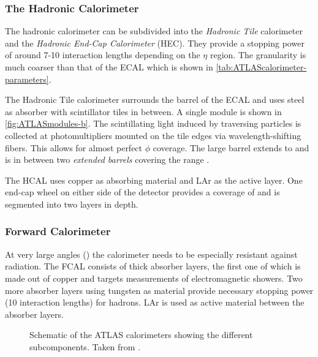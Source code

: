 \subsubsection{The Hadronic Calorimeter}
The hadronic calorimeter can be subdivided into the \emph{Hadronic Tile} calorimeter and the \emph{Hadronic End-Cap Calorimeter} (HEC). They provide a stopping power of around 7-10 interaction lengths depending on the $\eta$ region. The granularity is much coarser than that of the ECAL which is shown in \cref{tab:ATLAScalorimeter-parameters}.

The Hadronic Tile calorimeter surrounds the barrel of the ECAL and uses steel as absorber with scintillator tiles in between. A single module is shown in \cref{fig:ATLASmodules-b}. The scintillating light induced by traversing particles is collected at photomultipliers mounted on the tile edges via wavelength-shifting fibers. This allows for almost perfect $\phi$ coverage. The large barrel extends to  and is in between two \emph{extended barrels} covering the range . 

The HCAL uses copper as absorbing material and LAr as the active layer. One end-cap wheel on either side of the detector provides a coverage of  and is segmented into two layers in depth.

\subsubsection{Forward Calorimeter}
At very large angles () the calorimeter needs to be especially resistant against radiation. The FCAL consists of thick absorber layers, the first one of which is made out of copper and targets measurements of electromagnetic showers. Two more absorber layers using tungsten as material provide necessary stopping power (10 interaction lengths) for hadrons. LAr is used as active material between the absorber layers.




\begin{figure}
    \caption[Schematic of the ATLAS calorimeters showing the different subcomponents.]{Schematic of the ATLAS calorimeters showing the different subcomponents. Taken from .}
    \label{fig:ATLAScalorimeters}
\end{figure}

